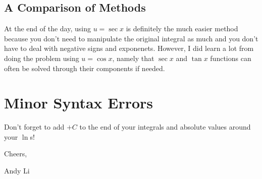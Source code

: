 \documentclass[letterpaper, 12pt]{article}
\begin{document}
    \subsection{A Comparison of Methods}
    At the end of the day, using $u=\sec x$ is definitely the much easier method because you don't need to manipulate the original integral as much and you don't have to deal with negative signs and exponenets. However, I did learn a lot from doing the problem using $u=\cos x$, namely that $\sec x$ and $\tan x$ functions can often be solved through their components if needed. 
    \section{Minor Syntax Errors}
    Don't forget to add $+C$ to the end of your integrals and absolute values around your $\ln$s! \bigskip \par
    Cheers, \par
    Andy Li
\end{document}
